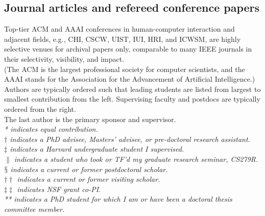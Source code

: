 \documentclass[10pt, a4paper]{article}
\newcommand{\years}[1]{\marginnote{\normalsize #1}}
\begin{document}
\subsection*{Journal articles and refereed conference papers}
\noindent
Top-tier ACM and AAAI conferences in human-computer interaction and adjacent fields, e.g., CHI, CSCW, UIST, IUI, HRI, and ICWSM, are highly selective venues for archival papers only, comparable to many IEEE journals in their selectivity, visibility, and impact.\\[0.1cm]
(The ACM is the largest professional society for computer scientists, and the AAAI stands for the Association for the Advancement of Artificial Intelligence.)\\[0.1cm]
Authors are typically ordered such that leading students are listed from largest to smallest contribution from the left. Supervising faculty and postdocs are typically ordered from the right. \\
The last author is the primary sponsor and supervisor.\\[0.2cm] %
\emph{* indicates equal contribution.}\\
\emph{$\dagger$ indicates a PhD advisee, Masters' advisee, or pre-doctoral research assistant.}\\
\emph{$\ddagger$ indicates a Harvard undergraduate student I supervised.}\\
\emph{$\|$ indicates a student who took or TF'd my graduate research seminar, CS279R.}\\
\emph{$\mathsection$ indicates a current or former postdoctoral scholar.}\\
\emph{$\dagger\dagger$ indicates a current or former visiting scholar.}\\
\emph{$\ddagger\ddagger$ indicates NSF grant co-PI.}\\
\emph{** indicates a PhD student for which I am or have been a doctoral thesis committee member.}
\end{document}
